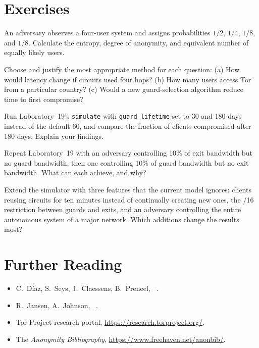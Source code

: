 \section*{Exercises}

\begin{esercizio}[1]\label{es:29-entropia}
An adversary observes a four-user system and assigns probabilities $1/2$, $1/4$, $1/8$, and $1/8$. Calculate the entropy, degree of anonymity, and equivalent number of equally likely users.
\end{esercizio}

\begin{esercizio}[1]\label{es:29-metodo}
Choose and justify the most appropriate method for each question: (a) How would latency change if circuits used four hops? (b) How many users access Tor from a particular country? (c) Would a new guard-selection algorithm reduce time to first compromise?
\end{esercizio}

\begin{esercizio}[2]\label{es:29-durata}
Run Laboratory~19's \texttt{simulate} with \texttt{guard\_lifetime} set to 30 and 180 days instead of the default 60, and compare the fraction of clients compromised after 180 days. Explain your findings.
\end{esercizio}

\begin{esercizio}[2]\label{es:29-asimmetria}
Repeat Laboratory~19 with an adversary controlling 10\% of exit bandwidth but no guard bandwidth, then one controlling 10\% of guard bandwidth but no exit bandwidth. What can each achieve, and why?
\end{esercizio}

\begin{esercizio}[3]\label{es:29-torps}
Extend the simulator with three features that the current model ignores: clients reusing circuits for ten minutes instead of continually creating new ones, the /16 restriction between guards and exits, and an adversary controlling the entire autonomous system of a major network. Which additions change the results most?
\end{esercizio}

\section*{Further Reading}
\begin{itemize}
  \item C.~Díaz, S.~Seys, J.~Claessens, B.~Preneel, ~\cite{diaz2002measuring}.
  \item R.~Jansen, A.~Johnson, ~\cite{jansen2016privcount}.
  \item Tor Project research portal, \url{https://research.torproject.org/}.
  \item The \emph{Anonymity Bibliography}, \url{https://www.freehaven.net/anonbib/}.
\end{itemize}

